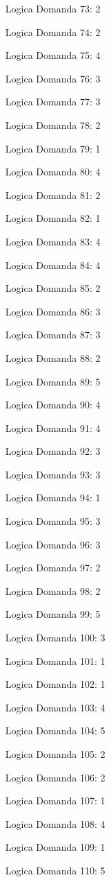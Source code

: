 \documentclass[20pt, a4paper]{article}
\begin{document}
\begin{itemize}[leftmargin=*]
\item [Logica] Domanda 73: 2
\item [Logica] Domanda 74: 2
\item [Logica] Domanda 75: 4
\item [Logica] Domanda 76: 3
\item [Logica] Domanda 77: 3
\item [Logica] Domanda 78: 2
\item [Logica] Domanda 79: 1
\item [Logica] Domanda 80: 4
\item [Logica] Domanda 81: 2
\item [Logica] Domanda 82: 1
\item [Logica] Domanda 83: 4
\item [Logica] Domanda 84: 4
\item [Logica] Domanda 85: 2
\item [Logica] Domanda 86: 3
\item [Logica] Domanda 87: 3
\item [Logica] Domanda 88: 2
\item [Logica] Domanda 89: 5
\item [Logica] Domanda 90: 4
\item [Logica] Domanda 91: 4
\item [Logica] Domanda 92: 3
\item [Logica] Domanda 93: 3
\item [Logica] Domanda 94: 1
\item [Logica] Domanda 95: 3
\item [Logica] Domanda 96: 3
\item [Logica] Domanda 97: 2
\item [Logica] Domanda 98: 2
\item [Logica] Domanda 99: 5
\item [Logica] Domanda 100: 3
\item [Logica] Domanda 101: 1
\item [Logica] Domanda 102: 1
\item [Logica] Domanda 103: 4
\item [Logica] Domanda 104: 5
\item [Logica] Domanda 105: 2
\item [Logica] Domanda 106: 2
\item [Logica] Domanda 107: 1
\item [Logica] Domanda 108: 4
\item [Logica] Domanda 109: 1
\item [Logica] Domanda 110: 5

\end{itemize}
\end{document}
